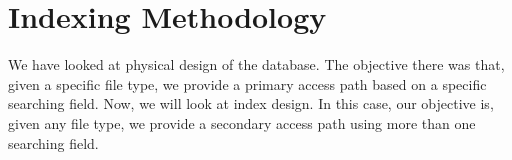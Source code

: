 \documentclass[a4paper, openany]{memoir}
\begin{document}

\newpage

\section{Indexing Methodology}
We have looked at physical design of the database. The objective there was that, given a specific file type, we provide a primary access path based on a specific searching field. Now, we will look at index design. In this case, our objective is, given any file type, we provide a secondary access path using more than one searching field. 
\end{document}
